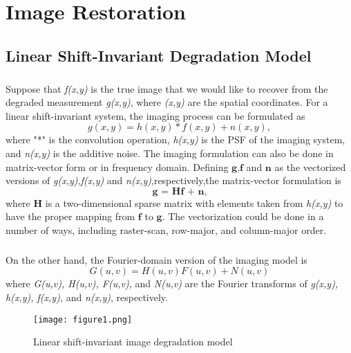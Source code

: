 \documentclass[a4paper]{book}
\begin{document}
	
	\chapter[\LARGE Image Restoration]{Image Restoration}\label{chapIR}
	\thispagestyle{empty}

	\section{\Large Linear Shift-Invariant Degradation Model}\label{secLSImodel}
	
	\paragraph*{}Suppose that \textit{f(x,y)} is the true image that we would like to recover from the degraded measurement \textit{g(x,y)}, where \textit{(x,y)} are the spatial coordinates. For a linear shift-invariant system, the imaging process can be formulated as 
	\begin{equation}
	\label{eq3.1}
	g(x,y) = h(x,y) * f(x,y) + n(x,y),
	\end{equation}
	where "*" is the convolution operation, \textit{h(x,y)} is the PSF of the imaging system, and \textit{n(x,y)} is the additive noise. The imaging formulation can also be done in matrix-vector form or in frequency domain. Defining $\textbf{g,f}$ and $\textbf{n}$ as the vectorized versions of \textit{g(x,y),f(x,y)} and \textit{n(x,y)},respectively,the matrix-vector formulation is
	\begin{equation}
	\label{eq3.2}
	\textbf{g = Hf + n,}
	\end{equation}
	where \textbf{H} is a two-dimensional sparse matrix with elements taken from \textit{h(x,y)} to have the proper mapping from $ \textbf{f} $ to $ \textbf{g} $. The vectorization could be done in a number of ways, including raster-scan, row-major, and column-major order.
	\paragraph*{} On the other hand, the Fourier-domain version of the imaging model is
	\begin{equation}
	\label{eq3.3}
	G(u,v) = H(u,v)F(u,v) + N(u,v)
	\end{equation}
	where \textit{G(u,v), H(u,v), F(u,v),} and \textit{N(u,v)} are the Fourier transforms of \textit{g(x,y), h(x,y), f(x,y),} and \textit{n(x,y)}, respectively.
%
	\begin{figure}[h]
	\begin{center}
		\texttt{[image: figure1.png]}
		\caption{\small Linear shift-invariant image degradation model}
		\label{fig:1}
	\end{center}
	\end{figure}
\end{document}
